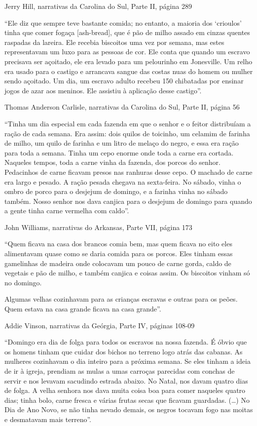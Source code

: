 Jerry Hill, narrativas da Carolina do Sul, Parte II, página 289

``Ele diz que sempre teve bastante comida; no entanto, a maioria dos
`crioulos' tinha que comer fogaça {[}ash-bread{]}, que é pão de milho
assado em cinzas quentes raspadas da lareira. Ele recebia biscoitos uma
vez por semana, mas estes representavam um luxo para as pessoas de cor.
Ele conta que quando um escravo precisava ser açoitado, ele era levado
para um pelourinho em Jonesville. Um relho era usado para o castigo e
arrancava sangue das costas nuas do homem ou mulher sendo açoitado. Um
dia, um escravo adulto recebeu 150 chibatadas por ensinar jogos de azar
aos meninos. Ele assistiu à aplicação desse castigo''.

Thomas Anderson Carlisle, narrativas da Carolina do Sul, Parte II,
página 56

``Tinha um dia especial em cada fazenda em que o senhor e o feitor
distribuíam a ração de cada semana. Era assim: dois quilos de toicinho,
um celamim de farinha de milho, um quilo de farinha e um litro de melaço
do negro, e essa era ração para toda a semana. Tinha um cepo enorme onde
toda a carne era cortada. Naqueles tempos, toda a carne vinha da
fazenda, dos porcos do senhor. Pedacinhos de carne ficavam presos nas
ranhuras desse cepo. O machado de carne era largo e pesado. A ração
pesada chegava na sexta-feira. No sábado, vinha o ombro de porco para o
desjejum de domingo, e a farinha vinha no sábado também. Nosso senhor
nos dava canjica para o desjejum de domingo para quando a gente tinha
carne vermelha com caldo''.

John Williams, narrativas do Arkansas, Parte VII, página 173

``Quem ficava na casa dos brancos comia bem, mas quem ficava no eito
eles alimentavam quase como se daria comida para os porcos. Eles tinham
essas gamelinhas de madeira onde colocavam um pouco de carne gorda,
caldo de vegetais e pão de milho, e também canjica e coisas assim. Os
biscoitos vinham só no domingo.

Algumas velhas cozinhavam para as crianças escravas e outras para os
peões. Quem estava na casa grande ficava na casa grande''.

Addie Vinson, narrativas da Geórgia, Parte IV, páginas 108-09

``Domingo era dia de folga para todos os escravos na nossa fazenda. É
óbvio que os homens tinham que cuidar dos bichos no terreno logo atrás
das cabanas. As mulheres cozinhavam o dia inteiro para a próxima semana.
Se eles tinham a ideia de ir à igreja, prendiam as mulas a umas carroças
parecidas com conchas de servir e nos levavam sacudindo estrada abaixo.
No Natal, nos davam quatro dias de folga. A velha senhora nos dava muita
coisa boa para comer naqueles quatro dias; tinha bolo, carne fresca e
várias frutas secas que ficavam guardadas. (\ldots{}) No Dia de Ano
Novo, se não tinha nevado demais, os negros tocavam fogo nas moitas e
desmatavam mais terreno''.

